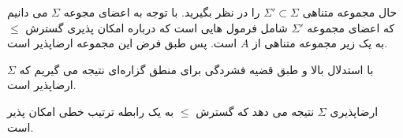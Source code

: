 \begin{ans}
    حال مجموعه متناهی
    $\Sigma' \subset \Sigma$
    را در نظر بگیرید. با توجه به اعضای مجوعه 
    $\Sigma$
    می دانیم که اعضای مجموعه 
    $\Sigma'$
    شامل فرمول هایی است که درباره امکان پذیری گسترش
    $\leq$
    به یک زیر مجموعه متناهی از 
    $A$
    است. پس طبق فرض این مجموعه ارضاپذیر است. 

    با استدلال بالا و طبق قضیه فشردگی برای منطق گزاره‌ای نتیجه می گیریم که 
    $\Sigma$
    ارضاپذیر است. 

    ارضاپذیری 
    $\Sigma$
    نتیجه می دهد که گسترش 
    $\leq$
    به یک رابطه ترتیب خطی 
    امکان پذیر است.


\end{ans}
